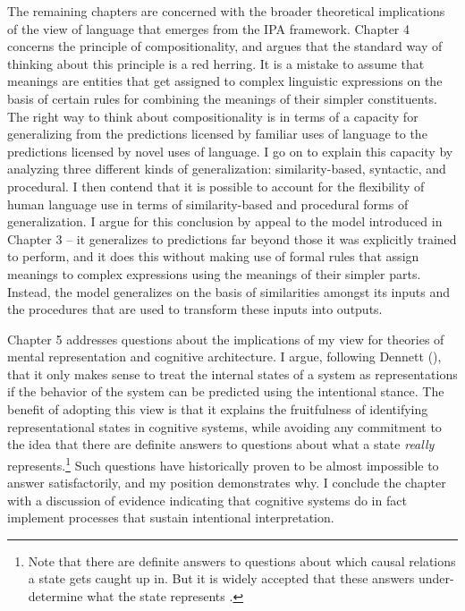 The remaining chapters are concerned with the broader theoretical implications of the view of language that emerges from the IPA framework. Chapter 4 concerns the principle of compositionality, and argues that the standard way of thinking about this principle is a red herring. It is a mistake to assume that meanings are entities that get assigned to complex linguistic expressions on the basis of certain rules for combining the meanings of their simpler constituents. The right way to think about compositionality is in terms of a capacity for generalizing from the predictions licensed by familiar uses of language to the predictions licensed by novel uses of language. I go on to explain this capacity by analyzing three different kinds of generalization: similarity-based, syntactic, and procedural. I then contend that it is possible to account for the flexibility of human language use in terms of similarity-based and procedural forms of generalization. I argue for this conclusion by appeal to the model introduced in Chapter 3 -- it generalizes to predictions far beyond those it was explicitly trained to perform, and it does this without making use of formal rules that assign meanings to complex expressions using the meanings of their simpler parts. Instead, the model generalizes on the basis of similarities amongst its inputs and the procedures that are used to transform these inputs into outputs. 

Chapter 5 addresses questions about the implications of my view for theories of mental representation and cognitive architecture. I argue, following Dennett (\citeyear{Dennett:1987}), that it only makes sense to treat the internal states of a system as representations if the behavior of the system can be predicted using the intentional stance. The benefit of adopting this view is that it explains the fruitfulness of identifying representational states in cognitive systems, while avoiding any commitment to the idea that there are definite answers to questions about what a state \textit{really} represents.\footnote{Note that there are definite answers to questions about which causal relations a state gets caught up in. But it is widely accepted that these answers under-determine what the state represents \citep{Dennett:1987}.} Such questions have historically proven to be almost impossible to answer satisfactorily, and my position demonstrates why. I conclude the chapter with a discussion of evidence indicating that cognitive systems do in fact implement processes that sustain intentional interpretation. 

